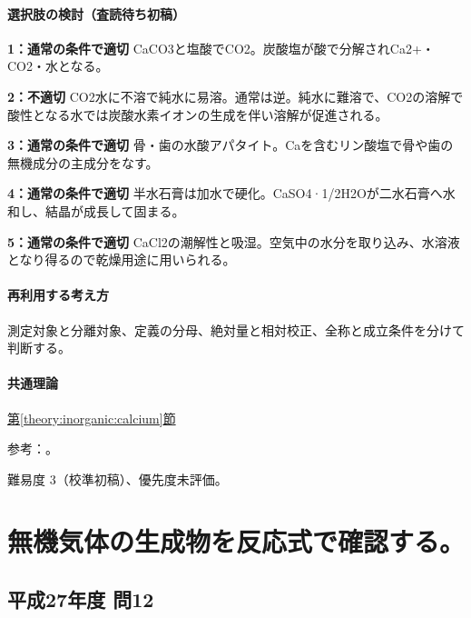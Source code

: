\paragraph{選択肢の検討（査読待ち初稿）}\mbox{}\par

\noindent\textbf{1：通常の条件で適切} CaCO3と塩酸でCO2。炭酸塩が酸で分解されCa2+・CO2・水となる。\par

\noindent\textbf{2：不適切} CO2水に不溶で純水に易溶。通常は逆。純水に難溶で、CO2の溶解で酸性となる水では炭酸水素イオンの生成を伴い溶解が促進される。\par

\noindent\textbf{3：通常の条件で適切} 骨・歯の水酸アパタイト。Caを含むリン酸塩で骨や歯の無機成分の主成分をなす。\par

\noindent\textbf{4：通常の条件で適切} 半水石膏は加水で硬化。CaSO4·1/2H2Oが二水石膏へ水和し、結晶が成長して固まる。\par

\noindent\textbf{5：通常の条件で適切} CaCl2の潮解性と吸湿。空気中の水分を取り込み、水溶液となり得るので乾燥用途に用いられる。\par

\paragraph{再利用する考え方} 測定対象と分離対象、定義の分母、絶対量と相対校正、全称と成立条件を分けて判断する。

\paragraph{共通理論} \hyperref[theory:inorganic:calcium]{第\ref*{theory:inorganic:calcium}節}

\par 参考：\cite{analysis49_gypsum_ref,inorganic_waterchem}。

\par 難易度 3（校準初稿）、優先度未評価。

\section{無機気体の生成物を反応式で確認する。}

\subsection{平成27年度 問12}
\label{q:h27-reg-applied-12}

